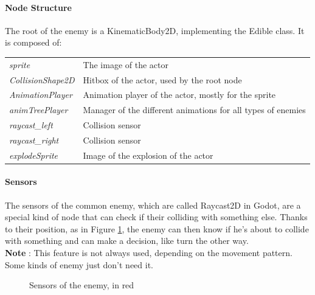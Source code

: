 \documentclass[10pt,a4paper]{article}
\begin{document}
\paragraph{Node Structure}
The root of the enemy is a KinematicBody2D, implementing the Edible class.
It is composed of: \\
\begin{tabular}{ l  l }
  \textit{sprite} & The image of the actor \\
  \textit{CollisionShape2D} & Hitbox of the actor, used by the root node \\
  \textit{AnimationPlayer} & Animation player of the actor, mostly for the sprite \\
  \textit{animTreePlayer} & Manager of the different animations for all types of enemies \\
  \textit{raycast\_left} & Collision sensor \\
  \textit{raycast\_right} & Collision sensor \\
  \textit{explodeSprite} & Image of the explosion of the actor \\
\end{tabular}

\paragraph{Sensors}
The sensors of the common enemy, which are called Raycast2D in Godot, are a special kind of node that can check if their colliding with something else. Thanks to their position, as in Figure \ref{fig:enemy_sensor}, the enemy can then know if he's about to collide with something and can make a decision, like turn the other way. \\
\textbf{Note} : This feature is not always used, depending on the movement pattern. Some kinds of enemy just don't need it.

\begin{figure}[h]
\centering
{}
\caption{Sensors of the enemy, in red}
\label{fig:enemy_sensor}
\end{figure}
\end{document}
